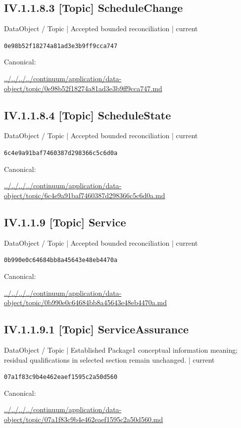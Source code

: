 \documentclass[10pt,a4paper]{article}
\begin{document}
\subsection*{IV.1.1.8.3 [Topic] ScheduleChange}
\label{element-0e98b52f18274a81ad3e3b9ff9cca747}
{\small DataObject / Topic | Accepted bounded reconciliation | current}\par
\texttt{0e98b52f18274a81ad3e3b9ff9cca747}\par
Canonical: \par
{\footnotesize\url{../../../../continuum/application/data-object/topic/0e98b52f18274a81ad3e3b9ff9cca747.md}}\par
\subsection*{IV.1.1.8.4 [Topic] ScheduleState}
\label{element-6c4e9a91baf7460387d298366c5c6d0a}
{\small DataObject / Topic | Accepted bounded reconciliation | current}\par
\texttt{6c4e9a91baf7460387d298366c5c6d0a}\par
Canonical: \par
{\footnotesize\url{../../../../continuum/application/data-object/topic/6c4e9a91baf7460387d298366c5c6d0a.md}}\par
\subsection*{IV.1.1.9 [Topic] Service}
\label{element-0b990e0c64684bb8a45643e48eb4470a}
{\small DataObject / Topic | Accepted bounded reconciliation | current}\par
\texttt{0b990e0c64684bb8a45643e48eb4470a}\par
Canonical: \par
{\footnotesize\url{../../../../continuum/application/data-object/topic/0b990e0c64684bb8a45643e48eb4470a.md}}\par
\subsection*{IV.1.1.9.1 [Topic] ServiceAssurance}
\label{element-07a1f83c9b4e462eaef1595c2a50d560}
{\small DataObject / Topic | Established Package1 conceptual information meaning; residual qualifications in selected section remain unchanged. | current}\par
\texttt{07a1f83c9b4e462eaef1595c2a50d560}\par
Canonical: \par
{\footnotesize\url{../../../../continuum/application/data-object/topic/07a1f83c9b4e462eaef1595c2a50d560.md}}\par
\end{document}
